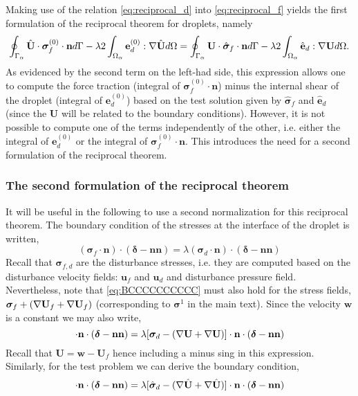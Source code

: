 Making use of the relation \ref{eq:reciprocal_d} into \ref{eq:reciprocal_f} yields the first formulation of the reciprocal theorem for droplets, namely  
\begin{equation}
    \intS{\hat{\textbf{U}}\cdot  \bm\sigma_f^{(0)} \cdot \textbf{n}}
    - \lambda 2\intO{\textbf{e}_d^{(0)} : \grad \hat{\textbf{U}}}
    = 
    \intS{\textbf{U}\cdot  \hat{\bm\sigma}_f \cdot \textbf{n}}
    -\lambda  2\intO{\hat{\textbf{e}}_d : \grad \textbf{U}}. 
    \label{eq:reciprocal_all}
\end{equation}
As evidenced by the second term on the left-had side, this expression  allows one to compute the force traction (integral of $\bm\sigma_f^{(0)} \cdot \textbf{n}$) minus the internal shear of the droplet (integral of $\textbf{e}_d^{(0)}$) based on the test solution given by $\hat{\bm\sigma}_f$ and $\hat{\textbf{e}}_d$ (since the \textbf{U} will be related to the boundary conditions).
However, it is not possible to compute one of the terms independently of the other, i.e. either the integral of $\textbf{e}_d^{(0)}$ or the integral of $\bm\sigma_f^{(0)} \cdot \textbf{n}$. 
This introduces the need for a second formulation of the reciprocal theorem. 

\subsubsection{The second formulation of the reciprocal theorem}
It will be useful in the following to use a second normalization for this reciprocal theorem. 
The boundary condition of the stresses at the interface of the droplet is written,
\begin{equation}
    (\bm\sigma_f\cdot\textbf{n})\cdot (\bm\delta - \textbf{nn})
    = \lambda (\bm\sigma_d\cdot \textbf{n})\cdot (\bm\delta - \textbf{nn})
    \label{eq:BCCCCCCCCCC}
\end{equation}
Recall that $\bm\sigma_{f,d}$ are the disturbance stresses, i.e. they are computed based on the disturbance velocity fields: $\textbf{u}_f$ and $\textbf{u}_d$ and disturbance pressure field. 
Nevertheless, note that \ref{eq:BCCCCCCCCCC} must also hold for the  stress fields, $\bm\sigma_f+ (\mathbf{\nabla} \textbf{U}_f+\mathbf{\nabla} \textbf{U}_f)$ (corresponding to $\bm\sigma^1$ in the main text).
Since the velocity $\textbf{w}$ is a constant we may also write,
\begin{equation}
    [\bm\sigma_f
    - (\grad \textbf{U}+\grad \textbf{U})
    ]\cdot \textbf{n}\cdot  (\bm\delta - \textbf{nn})
    = 
    \lambda [\bm\sigma_d
    - (\grad \textbf{U}+\grad \textbf{U})
    ]\cdot \textbf{n}\cdot (\bm\delta - \textbf{nn})
    \label{eq:BCCCCCCCCCC2}
\end{equation}
Recall that $\textbf{U} = \textbf{w} - \textbf{U}_f$ hence including a minus sing in this expression. 
Similarly, for the test problem we can derive the boundary condition, 
\begin{equation}
    [\hat{\bm\sigma}_f
    - (\grad \hat{\textbf{U}}+\grad \hat{\textbf{U}})
    ]\cdot \textbf{n}\cdot  (\bm\delta - \textbf{nn})
    = 
    \lambda [\hat{\bm\sigma}_d
    - (\grad \hat{\textbf{U}}+\grad \hat{\textbf{U}})
    ]\cdot \textbf{n}\cdot (\bm\delta - \textbf{nn})
    \label{eq:BCCCCCCCCCC3}
\end{equation}

